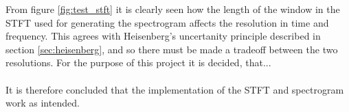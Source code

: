 From figure \ref{fig:test_stft} it is clearly seen how the length of the window in the STFT used for generating the spectrogram affects the resolution in time and frequency. This agrees with Heisenberg's uncertanity principle described in section \ref{sec:heisenberg}, and so there must be made a tradeoff between the two resolutions. For the purpose of this project it is decided, that...
\\ \\
It is therefore concluded that the implementation of the STFT and spectrogram work as intended.
